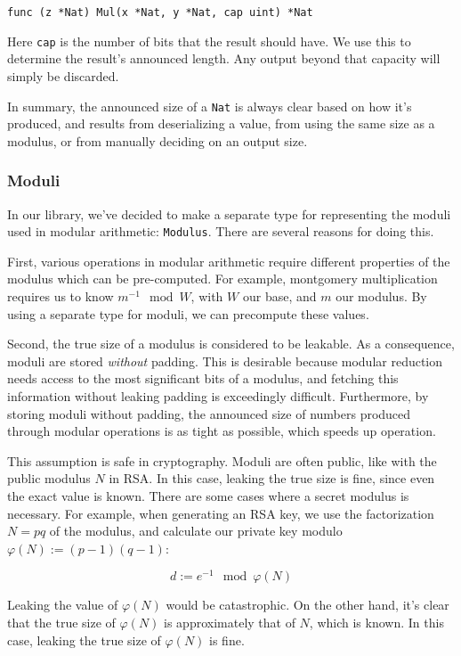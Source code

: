 \documentclass[11pt, a4paper]{article} %
\begin{document}
{\begin{verbatim}
func (z *Nat) Mul(x *Nat, y *Nat, cap uint) *Nat
\end{verbatim}

Here \texttt{cap} is the number of bits that the result should have.
We use this to determine the result's announced length. Any output
beyond that capacity will simply be discarded.

In summary, the announced size of a \texttt{Nat} is always
clear based on how it's produced, and results from deserializing
a value, from using the same size as a modulus, or from manually
deciding on an output size.

\subsubsection{Moduli}

In our library, we've decided to make a separate type for representing
the moduli used in modular arithmetic: \texttt{Modulus}. There are several
reasons for doing this.

First, various operations in modular arithmetic require different properties
of the modulus which can be pre-computed. For example, montgomery multiplication
requires us to know $m^{-1} \mod W$, with $W$ our base,
and $m$ our modulus. By using a separate type for moduli, we can
precompute these values.

Second, the true size of a modulus is considered to be leakable.
As a consequence, moduli are stored \emph{without} padding.
This is desirable because modular reduction needs access to the most
significant bits of a modulus, and fetching this information without
leaking padding is exceedingly difficult. Furthermore,
by storing moduli without padding, the announced size of numbers produced
through modular operations is as tight as possible, which speeds
up operation.

This assumption is safe in cryptography. Moduli are often public,
like with the public modulus $N$ in RSA. In this case, leaking
the true size is fine, since even the exact value is known. There
are some cases where a secret modulus is necessary. For example,
when generating an RSA key, we use the factorization $N = pq$ of the modulus,
and calculate our private key modulo $\varphi(N) := (p - 1)(q - 1)$:

$$
d := e^{-1} \mod \varphi(N)
$$

Leaking the value of $\varphi(N)$ would be catastrophic. On the other hand,
it's clear that the true size of $\varphi(N)$ is approximately
that of $N$, which is known. In this case, leaking the true size of
$\varphi(N)$ is fine.

}
\end{document}
